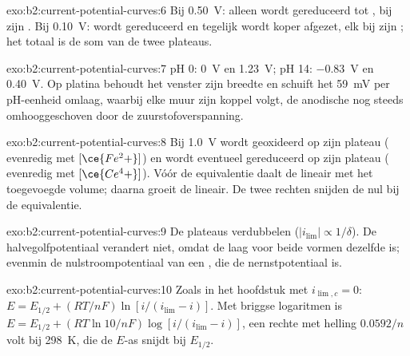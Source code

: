 \begin{solution}{exo:b2:current-potential-curves:6}
Bij \qty{0.50}{V}: alleen  wordt gereduceerd tot , bij zijn .
Bij \qty{0.10}{V}:  wordt gereduceerd en tegelijk wordt koper afgezet,
elk bij zijn ; het totaal is de som van de twee plateaus.
\end{solution}

\begin{solution}{exo:b2:current-potential-curves:7}
pH 0: \qty{0}{V} en \qty{1.23}{V}; pH 14: \qty{-0.83}{V} en \qty{0.40}{V}. Op
platina behoudt het venster zijn breedte en schuift het \qty{59}{mV} per pH-eenheid omlaag,
waarbij elke muur zijn koppel volgt, de anodische nog steeds omhooggeschoven door de
zuurstofoverspanning.
\end{solution}

\begin{solution}{exo:b2:current-potential-curves:8}
Bij \qty{1.0}{V} wordt  geoxideerd op zijn plateau (
evenredig met $[\ce{Fe^2+}]$) en wordt eventueel  gereduceerd op zijn plateau
( evenredig met $[\ce{Ce^4+}]$). Vóór de equivalentie daalt de
 lineair met het toegevoegde volume; daarna groeit de  lineair. De twee rechten snijden de nul bij de equivalentie.
\end{solution}

\begin{solution}{exo:b2:current-potential-curves:9}
De plateaus verdubbelen ($|i_{\lim}| \propto 1/\delta$). De halvegolfpotentiaal
verandert niet, omdat de laag voor beide vormen dezelfde is; evenmin de
nulstroompotentiaal van een , die de nernstpotentiaal is.
\end{solution}

\begin{solution}{exo:b2:current-potential-curves:10}
Zoals in het hoofdstuk met $i_{\lim,c} = 0$: $E = E_{1/2} + (RT/nF)\ln[i/(i_{\lim} -
i)]$. Met briggse logaritmen is $E = E_{1/2} + (RT\ln 10/nF)\log[i/(i_{\lim} - i)]$,
een rechte met helling $0.0592/n$ volt bij \qty{298}{K}, die de
$E$-as snijdt bij $E_{1/2}$.
\end{solution}

